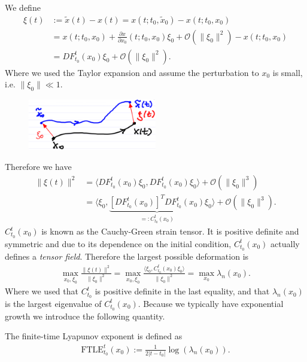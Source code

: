 \begin{ex}
	We define 
	\begin{align}
		 {\xi}(t) &:= \tilde{ {x}}(t) -  {x}(t) =  {x}(t; t_0, \tilde{ {x}}_0) -  {x}(t; t_0,  {x}_0)\\
		       &=  {x}(t; t_0,  {x}_0) + \frac{\partial  {x}}{\partial  {x}_0}(t; t_0,  {x}_0) {\xi}_0 + \mathcal{O}( \| {\xi}_0 \|^2) -  {x}(t; t_0,  {x}_0) \\
		       &= DF_{t_0}^{t}( {x}_0) {\xi}_0 + \mathcal{O}( \| {\xi}_0 \|^2).
	\end{align}
	Where we used the Taylor expansion and assume the perturbation to $ {x}_0$ is small, i.e. $ \| {\xi}_0 \| \ll 1$.
	\begin{figure}[h!]
		\centering
		\includegraphics[width=0.5\textwidth]{figures/ch1/8dispersion.png}
	\end{figure}
	Therefore we have
	\begin{align}
		 \| {\xi}(t) \|^2 &= \langle DF_{t_0}^{t}( {x}_0)  {\xi}_0, DF_{t_0}^{t}( {x}_0) {\xi}_0 \rangle + \mathcal{O}( \| {\xi}_0 \|^3) \\
			   &= \langle  {\xi}_0, \underbrace{\left[ DF_{t_0}^{t}( {x}_0) \right]^T DF_{t_0}^{t}( {x}_0)}_{=: C_{t_0}^{t}( {x}_0)}  {\xi}_0 \rangle + \mathcal{O}( \| {\xi}_0 \|^3).
	\end{align}
	$C_{t_0}^{t}( {x}_0)$ is known as the Cauchy-Green strain tensor. It is positive definite and symmetric and due to its dependence on the initial condition, $C_{t_0}^{t}(x_0)$ actually defines a \emph{tensor field}.
	Therefore the largest possible deformation is
	\begin{align}
		\max_{ {x}_0, {\xi}_0} \frac{ \| {\xi}(t) \|^2}{ \| {\xi}_0 \|^2} = \max_{ {x}_0,  {\xi}_0}\frac{\langle  {\xi}_0, C_{t_0}^{t}( {x}_0)  {\xi}_0 \rangle}{ \| {\xi}_0 \|^2} = \max_{ {x}_0} \lambda_{n}( {x}_0).
	\end{align}
	Where we used that $C_{t_0}^{t}$ is positive definite in the last equality, and that $\lambda_n( {x}_0)$ is the largest eigenvalue of $C_{t_0}^{t}( {x}_0)$. Because we typically have exponential growth we introduce the following quantity.	
\end{ex}
\begin{definition}
	The finite-time Lyapunov exponent is defined as
	\begin{align}
		\boxed{ \textrm{FTLE} _{t_0}^{t}( {x}_0) := \frac{1}{2|t-t_0|} \log(\lambda_n( {x}_0)).}
	\end{align}
\end{definition}
